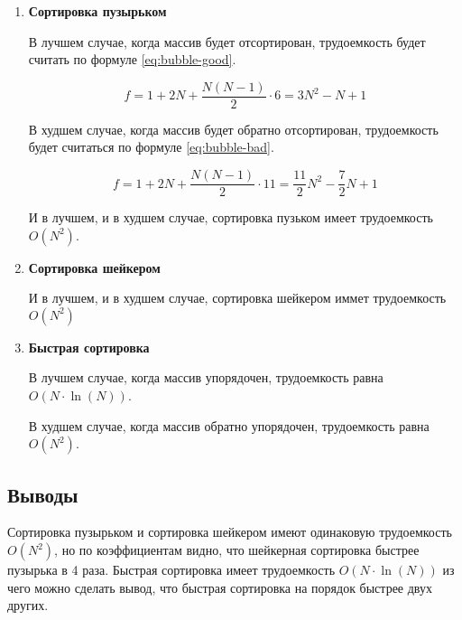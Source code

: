 \begin{enumerate}
    \item \textbf{Сортировка пузырьком}

        В лучшем случае, когда массив будет отсортирован, трудоемкость будет считать
        по формуле \ref{eq:bubble-good}.

        \begin{equation}\label{eq:bubble-good}
            f = 1 + 2N + \frac{N(N-1)}{2} \cdot 6 =
            3N^2 - N + 1
        \end{equation}

        В худшем случае, когда массив будет обратно отсортирован, трудоемкость будет
        считаться по формуле \ref{eq:bubble-bad}.

        \begin{equation}\label{eq:bubble-bad}
            f = 1 + 2N + \frac{N(N-1)}{2} \cdot 11 =
            \frac{11}{2}N^2 - \frac{7}{2}N + 1
        \end{equation}

        И в лучшем, и в худшем случае, сортировка пузьком имеет трудоемкость $O(N^2)$.

    \item \textbf{Сортировка шейкером} \cite{knuth}

        И в лучшем, и в худшем случае, сортировка шейкером иммет трудоемкость $O(N^2)$

    \item \textbf{Быстрая сортировка} \cite{knuth}

        В лучшем случае, когда массив упорядочен, трудоемкость равна $O(N \cdot \ln(N))$.

        В худшем случае, когда массив обратно упорядочен, трудоемкость равна $O(N^2)$.
\end{enumerate}

\subsection{Выводы}

Сортировка пузырьком и сортировка шейкером имеют одинаковую трудоемкость $O(N^2)$, но
по коэффициентам видно, что шейкерная сортировка быстрее пузырька в 4 раза. Быстрая
сортировка имеет трудоемкость $O(N \cdot \ln(N))$ из чего можно сделать вывод, что
быстрая сортировка на порядок быстрее двух других.
